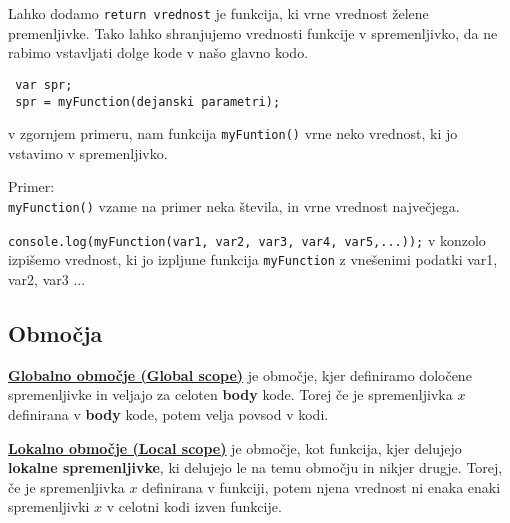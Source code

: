 Lahko dodamo  \texttt{return vrednost} je funkcija, ki vrne vrednost želene premenljivke.
Tako lahko shranjujemo vrednosti funkcije v spremenljivko, da ne rabimo vstavljati dolge kode v našo glavno kodo.

\begin{verbatim}
 var spr;
 spr = myFunction(dejanski parametri);
\end{verbatim}
v zgornjem primeru, nam funkcija \texttt{myFuntion()} vrne neko vrednost, ki jo vstavimo v spremenljivko.

Primer:\\
\texttt{myFunction()} vzame na primer neka števila, in vrne vrednost največjega.

\texttt{console.log(myFunction(var1, var2, var3, var4, var5,...));} v konzolo izpišemo vrednost, ki jo izpljune funkcija \texttt{myFunction} z vnešenimi podatki var1, var2, var3 ...

\subsection*{Območja}

\underline{\textbf{Globalno območje (Global scope)}} je območje, kjer definiramo določene spremenljivke in veljajo za celoten \textbf{body} kode. Torej če je spremenljivka $x$ definirana v \textbf{body} kode, potem velja povsod v kodi.

\textbf{\underline{Lokalno območje (Local scope)}} je območje, kot funkcija, kjer delujejo \textbf{lokalne spremenljivke}, ki delujejo le na temu območju in nikjer drugje. Torej, če je spremenljivka $x$ definirana v funkciji, potem njena vrednost ni enaka enaki spremenljivki $x$ v celotni kodi izven funkcije.
